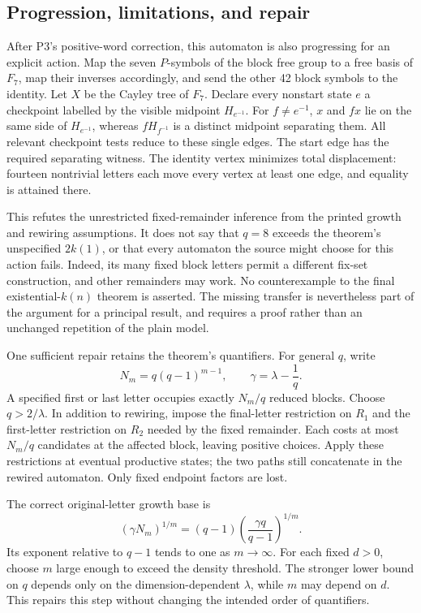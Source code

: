 \documentclass[10pt]{article}
\begin{document}
\subsection*{Progression, limitations, and repair}
After P3’s positive-word correction, this automaton is also progressing for an explicit action. Map the seven \(P\)-symbols of the block free group to a free basis of \(F_7\), map their inverses accordingly, and send the other 42 block symbols to the identity. Let \(X\) be the Cayley tree of \(F_7\). Declare every nonstart state \(e\) a checkpoint labelled by the visible midpoint \(H_{e^{-1}}\). For \(f\ne e^{-1}\), \(x\) and \(fx\) lie on the same side of \(H_{e^{-1}}\), whereas \(fH_{f^{-1}}\) is a distinct midpoint separating them. All relevant checkpoint tests reduce to these single edges. The start edge has the required separating witness. The identity vertex minimizes total displacement: fourteen nontrivial letters each move every vertex at least one edge, and equality is attained there.\par
This refutes the unrestricted fixed-remainder inference from the printed growth and rewiring assumptions. It does not say that \(q=8\) exceeds the theorem’s unspecified \(2k(1)\), or that every automaton the source might choose for this action fails. Indeed, its many fixed block letters permit a different fix-set construction, and other remainders may work. No counterexample to the final existential-\(k(n)\) theorem is asserted. The missing transfer is nevertheless part of the argument for a principal result, and requires a proof rather than an unchanged repetition of the plain model.\par
One sufficient repair retains the theorem’s quantifiers. For general \(q\), write \[N_m=q(q-1)^{m-1},\qquad \gamma=\lambda-\frac1q.\] A specified first or last letter occupies exactly \(N_m/q\) reduced blocks. Choose \(q>2/\lambda\). In addition to rewiring, impose the final-letter restriction on \(R_1\) and the first-letter restriction on \(R_2\) needed by the fixed remainder. Each costs at most \(N_m/q\) candidates at the affected block, leaving positive choices. Apply these restrictions at eventual productive states; the two paths still concatenate in the rewired automaton. Only fixed endpoint factors are lost.\par
The correct original-letter growth base is \[(\gamma N_m)^{1/m}
   =(q-1)\left(\frac{\gamma q}{q-1}\right)^{1/m}.\] Its exponent relative to \(q-1\) tends to one as \(m\to\infty\). For each fixed \(d>0\), choose \(m\) large enough to exceed the density threshold. The stronger lower bound on \(q\) depends only on the dimension-dependent \(\lambda\), while \(m\) may depend on \(d\). This repairs this step without changing the intended order of quantifiers.\par
\end{document}
